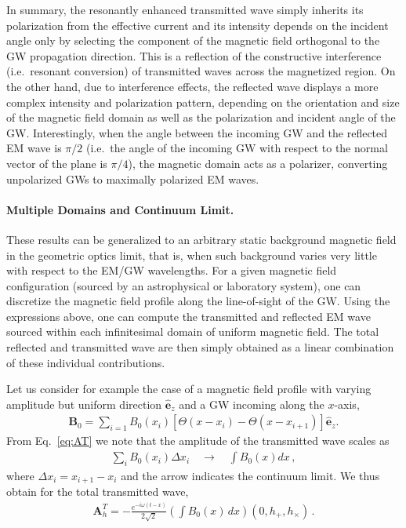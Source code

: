 \documentclass[a4paper,11pt]{article}
\begin{document}
In summary, the resonantly enhanced transmitted wave simply inherits its polarization from the effective current and its intensity depends on the incident angle only by selecting the component of the magnetic field orthogonal to the GW propagation direction.
%
This is a reflection of the constructive interference (i.e.\ resonant conversion) of transmitted waves across the magnetized region.
%
On the other hand, due to interference effects, the reflected wave displays a more complex intensity and polarization pattern, depending on the orientation and size of the magnetic field domain as well as the polarization and incident angle of the GW. 
%
Interestingly, when the angle between the incoming GW and the reflected EM wave is $\pi/2$ (i.e.\ the angle of the incoming GW with respect to the normal vector of the plane is $\pi/4$), the magnetic domain acts as a polarizer, converting unpolarized GWs to maximally polarized EM waves.





\paragraph{Multiple Domains and Continuum Limit.}
%
These results can be generalized to an arbitrary static background magnetic field in the geometric optics limit, that is, when such background varies very little with respect to the EM/GW wavelengths.
%
For a given magnetic field configuration (sourced by an astrophysical or laboratory system), one can discretize the magnetic field profile along the line-of-sight of the GW.
%
Using the expressions above, one can compute the transmitted and reflected EM wave sourced within each infinitesimal domain of uniform magnetic field.
%
The total reflected and transmitted wave are then simply obtained as a linear combination of these individual contributions.




Let us consider for example the case of a magnetic field profile with varying amplitude but uniform direction $\hat{\bm e}_z$ and a GW incoming along the $x$-axis,
%
\begin{align}
    {\bm B}_0 = \sum_{i=1}   B_{0}(x_{i}) \left[ \Theta(x-x_{i}) -  \Theta(x-x_{i+1})  \right] \hat{\bm e}_{z}.
\end{align}
%
From Eq.~\eqref{eq:AT} we note that the amplitude of the transmitted wave scales as
%
\begin{align}
 \sum_i B_0(x_i) \Delta x_i  \quad \rightarrow \quad \int B_0(x) dx\,,
\end{align}
%
where $\Delta x_i = x_{i+1} - x_i$ and the arrow indicates the continuum limit. We thus obtain for the total transmitted wave,
%
\begin{align}
\label{eq:Gen_T}
  {\bm A}_{h}^{T} =
       - \frac{e^{- i \omega ( t - x )}}{ 2 \sqrt{2} } \left( \int B_0(x) \, dx \right)
     \left( 0, h_{+}, h_{\times} \right) \,.%
\end{align}
%
\end{document}
